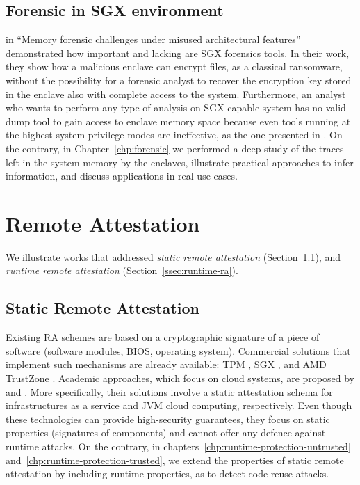 \subsection{Forensic in SGX environment}
\label{ssec:forensic-in-sgx}
\cite{zhang2018memory} in ``Memory forensic challenges under
misused architectural features'' demonstrated how important and lacking are SGX
forensics tools. In their work, they show how a malicious enclave can encrypt
files, as a classical ransomware, without the possibility for a forensic analyst
to recover the encryption key stored in the enclave also with complete access to
the system.
Furthermore, an analyst who wants to perform any type of analysis on SGX
capable system has no valid dump tool to gain access to enclave
memory space because even tools running at the highest system privilege
modes are ineffective, as the one presented in \cite{reina2012hardware}.
On the contrary, in Chapter~\ref{chp:forensic} we performed a deep study of the 
traces left in the system memory by the enclaves, illustrate practical 
approaches to infer information, and discuss applications in real use cases.

\section{Remote Attestation}

\label{sec:remote-attestation}

We illustrate works that addressed \emph{static remote attestation} 
(Section~\ref{ssec:static-ra}), and \emph{runtime remote attestation} 
(Section~\ref{ssec:runtime-ra}).

\subsection{Static Remote Attestation}
\label{ssec:static-ra}

Existing RA schemes are based on a cryptographic signature of a piece of 
software (\eg software modules, BIOS, operating system). Commercial solutions 
that implement such mechanisms are already available: 
TPM \citep{tomlinson2017introduction}, SGX \citep{costan2016intel}, and AMD 
TrustZone \citep{winter2008trusted}. 
Academic approaches, which focus on cloud systems, are proposed by 
\cite{wang2018trusted} and \cite{ba2017jmonatt}. 
More specifically, their solutions involve a static attestation schema for 
infrastructures as a service and JVM cloud computing, respectively. 
Even though these technologies can provide high-security guarantees, they focus 
on static properties (\ie signatures of components) and cannot offer any 
defence against runtime attacks.
On the contrary, in chapters~\ref{chp:runtime-protection-untrusted} 
and~\ref{chp:runtime-protection-trusted}, we extend the properties of static 
remote attestation by including runtime properties, as to detect code-reuse 
attacks.

